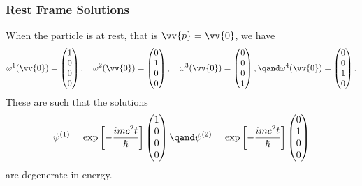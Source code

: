\documentclass[fleqn]{NotesClass}
\begin{document}
\begin{appendices}
        \subsubsection{Rest Frame Solutions}
        When the particle is at rest, that is \(\vv{p} = \vv{0}\), we have
        \begin{equation}
            \omega^1(\vv{0}) = 
            \begin{pmatrix}
                1\\ 0\\ 0\\ 0
            \end{pmatrix}
            , \quad \omega^2(\vv{0}) = 
            \begin{pmatrix}
                0\\ 1\\ 0\\ 0
            \end{pmatrix}
            , \quad \omega^3(\vv{0}) = 
            \begin{pmatrix}
                0\\ 0\\ 0\\ 1
            \end{pmatrix}
            , \qand \omega^4(\vv{0}) = 
            \begin{pmatrix}
                0\\ 0\\ 1\\ 0
            \end{pmatrix}
            .
        \end{equation}
        These are such that the solutions
        \begin{equation}
            \psi^{(1)} = \exp\left[ -\frac{imc^2t}{\hbar} \right] 
            \begin{pmatrix}
                1\\ 0\\ 0\\ 0
            \end{pmatrix}
            \qand
            \psi^{(2)} = \exp\left[ -\frac{imc^2t}{\hbar} \right]
            \begin{pmatrix}
                0\\ 1\\ 0\\ 0
            \end{pmatrix}
        \end{equation}
        are degenerate in energy.

\end{appendices}
\end{document}
